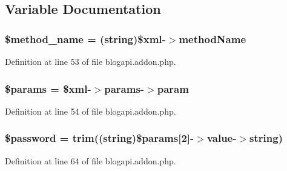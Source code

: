 \subsection{Variable Documentation}
\subsubsection[{\texorpdfstring{\$method\+\_\+name}{$method_name}}]{\setlength{\rightskip}{0pt plus 5cm}\$method\+\_\+name = (string)\$xml-\/$>$method\+Name}\hypertarget{blogapi_8addon_8php_a88c34f4701e451bbcef63e44e5902ebd}{}\label{blogapi_8addon_8php_a88c34f4701e451bbcef63e44e5902ebd}


Definition at line 53 of file blogapi.\+addon.\+php.

\subsubsection[{\texorpdfstring{\$params}{$params}}]{\setlength{\rightskip}{0pt plus 5cm}\$params = \$xml-\/$>$params-\/$>${\bf param}}\hypertarget{blogapi_8addon_8php_afe68e6fbe7acfbffc0af0c84a1996466}{}\label{blogapi_8addon_8php_afe68e6fbe7acfbffc0af0c84a1996466}


Definition at line 54 of file blogapi.\+addon.\+php.

\subsubsection[{\texorpdfstring{\$password}{$password}}]{\setlength{\rightskip}{0pt plus 5cm}\$password = {\bf trim}((string)\$params\mbox{[}2\mbox{]}-\/$>${\bf value}-\/$>$string)}\hypertarget{blogapi_8addon_8php_a607686ef9f99ea7c42f4f3dd3dbb2b0d}{}\label{blogapi_8addon_8php_a607686ef9f99ea7c42f4f3dd3dbb2b0d}


Definition at line 64 of file blogapi.\+addon.\+php.

